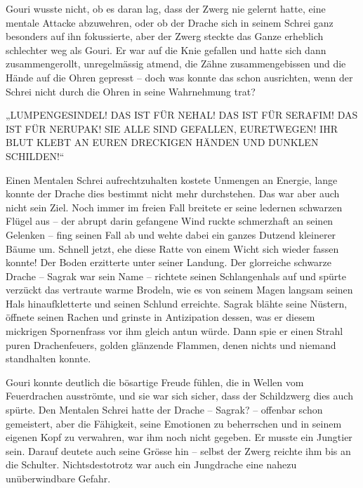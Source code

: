 Gouri wusste nicht, ob es daran lag, dass der Zwerg nie gelernt hatte, eine mentale Attacke abzuwehren, oder ob der Drache sich in seinem Schrei ganz besonders auf ihn fokussierte, aber der Zwerg steckte das Ganze erheblich schlechter weg als Gouri. Er war auf die Knie gefallen und hatte sich dann zusammengerollt, unregelmässig atmend, die Zähne zusammengebissen und die Hände auf die Ohren gepresst – doch was konnte das schon ausrichten, wenn der Schrei nicht durch die Ohren in seine Wahrnehmung trat?

„LUMPENGESINDEL! DAS IST FÜR NEHAL! DAS IST FÜR SERAFIM! DAS IST FÜR NERUPAK! SIE ALLE SIND GEFALLEN, EURETWEGEN! IHR BLUT KLEBT AN EUREN DRECKIGEN HÄNDEN UND DUNKLEN SCHILDEN!“

Einen Mentalen Schrei aufrechtzuhalten kostete Unmengen an Energie, lange konnte der Drache dies bestimmt nicht mehr durchstehen. Das war aber auch nicht sein Ziel. Noch immer im freien Fall breitete er seine ledernen schwarzen Flügel aus – der abrupt darin gefangene Wind ruckte schmerzhaft an seinen Gelenken – fing seinen Fall ab und wehte dabei ein ganzes Dutzend kleinerer Bäume um. Schnell jetzt, ehe diese Ratte von einem Wicht sich wieder fassen konnte! Der Boden erzitterte unter seiner Landung. Der glorreiche schwarze Drache – Sagrak war sein Name – richtete seinen Schlangenhals auf und spürte verzückt das vertraute warme Brodeln, wie es von seinem Magen langsam seinen Hals hinaufkletterte und seinen Schlund erreichte. Sagrak blähte seine Nüstern, öffnete seinen Rachen und grinste in Antizipation dessen, was er diesem mickrigen Spornenfrass vor ihm gleich antun würde. Dann spie er einen Strahl puren Drachenfeuers, golden glänzende Flammen, denen nichts und niemand standhalten konnte.

Gouri konnte deutlich die bösartige Freude fühlen, die in Wellen vom Feuerdrachen ausströmte, und sie war sich sicher, dass der Schildzwerg dies auch spürte. Den Mentalen Schrei hatte der Drache – Sagrak? – offenbar schon gemeistert, aber die Fähigkeit, seine Emotionen zu beherrschen und in seinem eigenen Kopf zu verwahren, war ihm noch nicht gegeben. Er musste ein Jungtier sein. Darauf deutete auch seine Grösse hin – selbst der Zwerg reichte ihm bis an die Schulter. Nichtsdestotrotz war auch ein Jungdrache eine nahezu unüberwindbare Gefahr.

